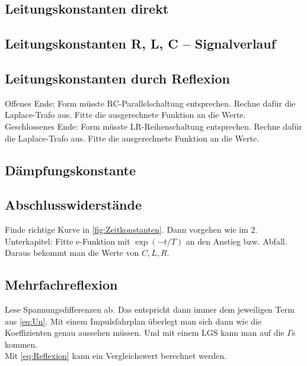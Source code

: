 \subsection{Leitungskonstanten direkt}
\clearpage
\subsection{Leitungskonstanten R, L, C -- Signalverlauf}

\clearpage
\subsection{Leitungskonstanten durch Reflexion}
Offenes Ende: Form müsste RC-Parallelschaltung entsprechen. Rechne dafür die Laplace-Trafo aus. Fitte die ausgerechnete Funktion an die Werte. \\
Geschlossenes Ende: Form müsste LR-Reihenschaltung entsprechen. Rechne dafür die Laplace-Trafo aus. Fitte die ausgerechnete Funktion an die Werte.
\subsection{Dämpfungskonstante}

\subsection{Abschlusswiderstände}
Finde richtige Kurve in \ref{fig:Zeitkonstanten}. Dann vorgehen wie im 2. Unterkapitel: Fitte e-Funktion mit $\exp(-t/T)$ an den Anstieg bzw. Abfall. Daraus bekommt man die Werte von $C,L,R$.
\subsection{Mehrfachreflexion}
Lese Spannungsdifferenzen ab. Das entspricht dann immer dem jeweiligen Term aus \eqref{eq:Un}. Mit einem Impulsfahrplan überlegt man sich dann wie die Koeffizienten genau aussehen müssen. Und mit einem LGS kann man auf die $\Gamma$s kommen. \\
Mit \eqref{eq:Reflexion} kann ein Vergleichswert berechnet werden.
